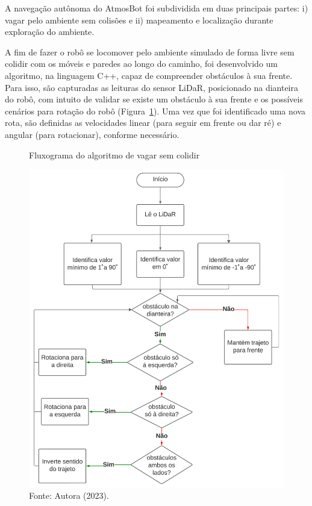 A navegação autônoma do AtmosBot foi subdividida em duas principais partes: i) vagar pelo ambiente sem colisões e ii) mapeamento e localização durante exploração do ambiente.

A fim de fazer o robô se locomover pelo ambiente simulado de forma livre sem colidir com os móveis e paredes ao longo do caminho, foi desenvolvido um algoritmo, na linguagem C++, capaz de compreender obstáculos à sua frente. Para isso, são capturadas as leituras do sensor LiDaR, posicionado na dianteira do robô, com intuito de validar se existe um obstáculo à sua frente e os possíveis cenários para rotação do robô (Figura~\ref{fig:fluxogramaEvitarObstaculos}).  Uma vez que foi identificado uma nova rota, são definidas as velocidades linear (para seguir em frente ou dar ré) e angular (para rotacionar), conforme necessário.

\begin{figure}[h]
    \centering
    \caption{Fluxograma do algoritmo de vagar sem colidir}
    \includegraphics[scale=0.45]{fluxogramaEvitarObstaculos.png}
    
    \caption*{Fonte: Autora (2023).}
    \label{fig:fluxogramaEvitarObstaculos}
\end{figure}

